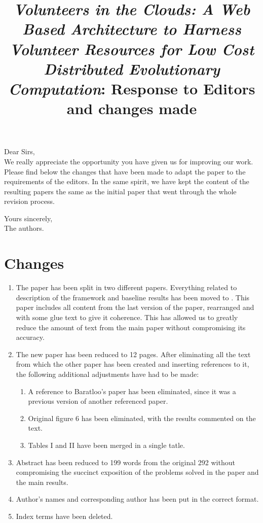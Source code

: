 \documentclass[preprint]{elsarticle}
\begin{document}

\title{{\em Volunteers in the Clouds: A Web Based Architecture to Harness Volunteer Resources 
for Low Cost Distributed Evolutionary Computation}: Response to
Editors and changes made}

\noindent
Dear Sirs,\\

We really appreciate the opportunity you have given us for improving
our work. Please find below the changes that have been made to adapt
the paper to the requirements of the editors. In the same spirit, we
have kept the content of the resulting papers the same as the initial
paper that went through the whole revision process. 

\noindent
Yours sincerely,\\
The authors.

\section*{Changes}

\begin{enumerate}
\item The paper has been split in two different papers. Everything
  related to description of the framework and baseline results has
  been moved to \cite{2016arXiv160101607M}. This paper includes all
  content from the last version of the paper, rearranged and with some
  glue text to give it coherence. This has allowed us to greatly
  reduce the amount of text from the main paper without compromising
  its accuracy.
\item The new paper has been reduced to 12 pages. After eliminating
  all the text from which the other paper has been created and
  inserting references to it, the following additional adjustments
  have had to be made:\begin{enumerate}
  \item A reference to Baratloo's paper has been eliminated, since it
    was a previous version of another referenced paper.
  \item Original figure 6 has been eliminated, with the results
    commented on the text.
  \item Tables I and II have been merged in a single tatle.
  \end{enumerate}
\item Abstract has been reduced to 199 words from the original 292
  without compromising the succinct exposition of the problems solved
  in the paper and the main results.
\item Author's names and corresponding author has been put in the
  correct format.
\item Index terms have been deleted. 
\end{enumerate}




\end{document}
